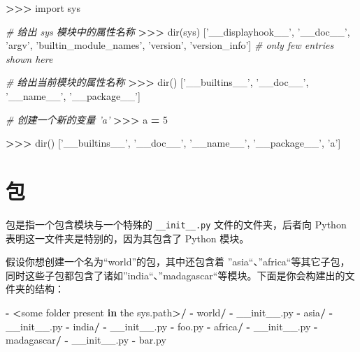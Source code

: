 \documentclass[]{ctexbook}
\newenvironment{Shaded}{\begin{snugshade}}{\end{snugshade}}
\newcommand{\BuiltInTok}[1]{#1}
\newcommand{\CommentTok}[1]{\textcolor[rgb]{0.56,0.35,0.01}{\textit{#1}}}
\newcommand{\DecValTok}[1]{\textcolor[rgb]{0.00,0.00,0.81}{#1}}
\newcommand{\FunctionTok}[1]{\textcolor[rgb]{0.00,0.00,0.00}{#1}}
\newcommand{\ImportTok}[1]{#1}
\newcommand{\KeywordTok}[1]{\textcolor[rgb]{0.13,0.29,0.53}{\textbf{#1}}}
\newcommand{\NormalTok}[1]{#1}
\newcommand{\OperatorTok}[1]{\textcolor[rgb]{0.81,0.36,0.00}{\textbf{#1}}}
\newcommand{\StringTok}[1]{\textcolor[rgb]{0.31,0.60,0.02}{#1}}
\begin{document}
\begin{Shaded}
\begin{Highlighting}[]
\OperatorTok{>>>} \ImportTok{import}\NormalTok{ sys}

\CommentTok{# 给出 sys 模块中的属性名称}
\OperatorTok{>>>} \BuiltInTok{dir}\NormalTok{(sys)}
\NormalTok{[}\StringTok{'__displayhook__'}\NormalTok{, }\StringTok{'__doc__'}\NormalTok{,}
\StringTok{'argv'}\NormalTok{, }\StringTok{'builtin_module_names'}\NormalTok{,}
\StringTok{'version'}\NormalTok{, }\StringTok{'version_info'}\NormalTok{]}
\CommentTok{# only few entries shown here}

\CommentTok{# 给出当前模块的属性名称}
\OperatorTok{>>>} \BuiltInTok{dir}\NormalTok{()}
\NormalTok{[}\StringTok{'__builtins__'}\NormalTok{, }\StringTok{'__doc__'}\NormalTok{,}
\StringTok{'__name__'}\NormalTok{, }\StringTok{'__package__'}\NormalTok{]}

\CommentTok{# 创建一个新的变量 'a'}
\OperatorTok{>>>}\NormalTok{ a }\OperatorTok{=} \DecValTok{5}

\OperatorTok{>>>} \BuiltInTok{dir}\NormalTok{()}
\NormalTok{[}\StringTok{'__builtins__'}\NormalTok{, }\StringTok{'__doc__'}\NormalTok{, }\StringTok{'__name__'}\NormalTok{, }\StringTok{'__package__'}\NormalTok{, }\StringTok{'a'}\NormalTok{]}
\end{Highlighting}
\end{Shaded}

\hypertarget{ux5305}{%
\section{包}\label{ux5305}}

包是指一个包含模块与一个特殊的 \texttt{\_\_init\_\_.py} 文件的文件夹，后者向 Python 表明这一文件夹是特别的，因为其包含了 Python 模块。

假设你想创建一个名为``world''的包，其中还包含着 ''asia``、''africa``等其它子包，同时这些子包都包含了诸如''india``、''madagascar``等模块。下面是你会构建出的文件夹的结构：

\begin{Shaded}
\begin{Highlighting}[]
\OperatorTok{-} \OperatorTok{<}\NormalTok{some folder present }\KeywordTok{in}\NormalTok{ the sys.path}\OperatorTok{>/}
    \OperatorTok{-}\NormalTok{ world}\OperatorTok{/}
        \OperatorTok{-} \FunctionTok{__init__}\NormalTok{.py}
        \OperatorTok{-}\NormalTok{ asia}\OperatorTok{/}
            \OperatorTok{-} \FunctionTok{__init__}\NormalTok{.py}
            \OperatorTok{-}\NormalTok{ india}\OperatorTok{/}
                \OperatorTok{-} \FunctionTok{__init__}\NormalTok{.py}
                \OperatorTok{-}\NormalTok{ foo.py}
        \OperatorTok{-}\NormalTok{ africa}\OperatorTok{/}
            \OperatorTok{-} \FunctionTok{__init__}\NormalTok{.py}
            \OperatorTok{-}\NormalTok{ madagascar}\OperatorTok{/}
                \OperatorTok{-} \FunctionTok{__init__}\NormalTok{.py}
                \OperatorTok{-}\NormalTok{ bar.py}
\end{Highlighting}
\end{Shaded}
\end{document}
